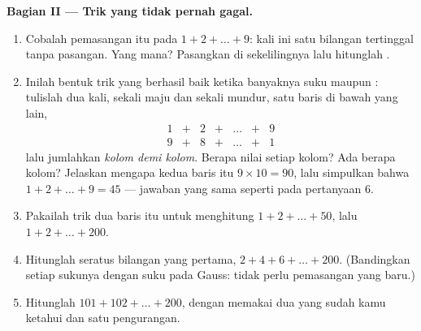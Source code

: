 \begin{problem}
\medskip
\noindent\textbf{Bagian II --- Trik yang tidak pernah gagal.}
\begin{enumerate}[resume]
  \item Cobalah pemasangan itu pada $1 + 2 + \dots + 9$: kali ini
        satu bilangan tertinggal tanpa pasangan. Yang mana?
        Pasangkan di sekelilingnya lalu hitunglah .
  \item Inilah bentuk trik yang berhasil baik ketika banyaknya suku
         maupun : tulislah  dua kali, sekali maju
        dan sekali mundur, satu baris di bawah yang lain,
        \[
        \begin{array}{ccccccc}
        1 & + & 2 & + & \dots & + & 9 \\
        9 & + & 8 & + & \dots & + & 1
        \end{array}
        \]
        lalu jumlahkan \emph{kolom demi kolom}. Berapa nilai setiap
        kolom? Ada berapa kolom? Jelaskan mengapa  kedua baris
        itu $9 \times 10 = 90$, lalu simpulkan bahwa
        $1 + 2 + \dots + 9 = 45$ --- jawaban yang sama seperti pada
        pertanyaan 6.
  \item Pakailah trik dua baris itu untuk menghitung
        $1 + 2 + \dots + 50$, lalu $1 + 2 + \dots + 200$.
  \item Hitunglah  seratus bilangan \emph{} yang pertama,
        $2 + 4 + 6 + \dots + 200$. (Bandingkan setiap sukunya dengan
        suku pada  Gauss: tidak perlu pemasangan yang baru.)
  \item Hitunglah $101 + 102 + \dots + 200$, dengan memakai dua
         yang sudah kamu ketahui dan satu pengurangan.
\end{enumerate}


\end{problem}
